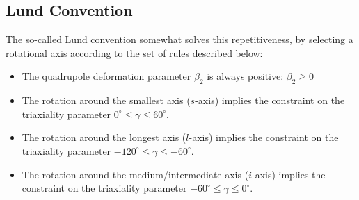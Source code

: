 \subsection{Lund Convention}
\label{subsection:lund-convention}

The so-called Lund convention \cite{andersson1976nuclear} somewhat solves this repetitiveness, by selecting a rotational axis according to the set of rules described below:
\begin{itemize}
    \item The quadrupole deformation parameter $\beta_2$ is always positive: $\beta_2\geq 0 $
    \item The rotation around the smallest axis ($s$-axis) implies the constraint on the triaxiality parameter $0^\circ\leq\gamma\leq60^\circ$.
    \item The rotation around the longest axis ($l$-axis) implies the constraint on the triaxiality parameter $-120^\circ\leq\gamma\leq-60^\circ$.
    \item The rotation around the medium/intermediate axis ($i$-axis) implies the constraint on the triaxiality parameter $-60^\circ\leq\gamma\leq 0^\circ$.
\end{itemize}

